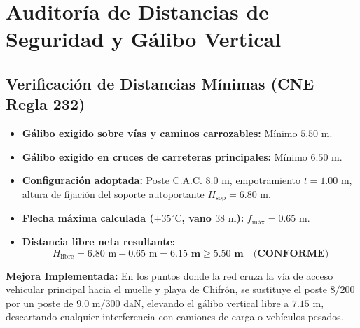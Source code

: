 \documentclass[12pt,a4paper]{report}
\begin{document}
\section{Auditoría de Distancias de Seguridad y Gálibo Vertical}
\subsection{Verificación de Distancias Mínimas (CNE Regla 232)}
\begin{itemize}
    \item \textbf{Gálibo exigido sobre vías y caminos carrozables:} Mínimo $5.50\text{ m}$.
    \item \textbf{Gálibo exigido en cruces de carreteras principales:} Mínimo $6.50\text{ m}$.
    \item \textbf{Configuración adoptada:} Poste C.A.C. $8.0\text{ m}$, empotramiento $t = 1.00\text{ m}$, altura de fijación del soporte autoportante $H_{\text{sop}} = 6.80\text{ m}$.
    \item \textbf{Flecha máxima calculada ($+35^\circ\text{C}$, vano $38\text{ m}$):} $f_{\text{máx}} = 0.65\text{ m}$.
    \item \textbf{Distancia libre neta resultante:}
    \begin{equation}
        H_{\text{libre}} = 6.80\text{ m} - 0.65\text{ m} = \mathbf{6.15\text{ m} \ge 5.50\text{ m}} \quad \textbf{(CONFORME)}
    \end{equation}
\end{itemize}
\textbf{Mejora Implementada:} En los puntos donde la red cruza la vía de acceso vehicular principal hacia el muelle y playa de Chifrón, se sustituye el poste $8/200$ por un poste de \textbf{$9.0\text{ m} / 300\text{ daN}$}, elevando el gálibo vertical libre a $7.15\text{ m}$, descartando cualquier interferencia con camiones de carga o vehículos pesados.
\end{document}
